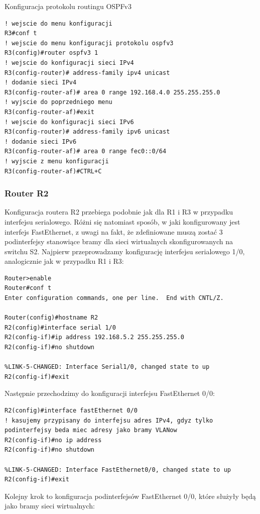 \documentclass[polish,11pt,a4paper,twoside]{article}
\begin{document}
Konfiguracja protokolu routingu OSPFv3
\begin{lstlisting}
! wejscie do menu konfiguracji
R3#conf t
! wejscie do menu konfiguracji protokolu ospfv3
R3(config)#router ospfv3 1 
! wejscie do konfiguracji sieci IPv4
R3(config-router)# address-family ipv4 unicast 
! dodanie sieci IPv4
R3(config-router-af)# area 0 range 192.168.4.0 255.255.255.0 
! wyjscie do poprzedniego menu
R3(config-router-af)#exit
! wejscie do konfiguracji sieci IPv6
R3(config-router)# address-family ipv6 unicast
! dodanie sieci IPv6
R3(config-router-af)# area 0 range fec0::0/64
! wyjscie z menu konfiguracji
R3(config-router-af)#CTRL+C
\end{lstlisting}

\subsubsection{Router R2}
Konfiguracja routera R2 przebiega podobnie jak dla R1 i R3 w przypadku interfejsu serialowego. Różni się natomiast sposób, w jaki konfigurowany jest interfejs FastEthernet, z uwagi na fakt, że zdefiniowane muszą zostać 3 podinterfejsy stanowiące bramy dla sieci wirtualnych skonfigurowanych na switchu S2.
Najpierw przeprowadzamy konfigurację interfejsu serialowego 1/0, analogicznie jak w przypadku R1 i R3:
\begin{lstlisting}
Router>enable
Router#conf t
Enter configuration commands, one per line.  End with CNTL/Z.

Router(config)#hostname R2
R2(config)#interface serial 1/0
R2(config-if)#ip address 192.168.5.2 255.255.255.0
R2(config-if)#no shutdown 

%LINK-5-CHANGED: Interface Serial1/0, changed state to up
R2(config-if)#exit
\end{lstlisting}
Następnie przechodzimy do konfiguracji interfejsu FastEthernet 0/0:
\begin{lstlisting}
R2(config)#interface fastEthernet 0/0
! kasujemy przypisany do interfejsu adres IPv4, gdyz tylko podinterfejsy beda miec adresy jako bramy VLANow
R2(config-if)#no ip address
R2(config-if)#no shutdown 

%LINK-5-CHANGED: Interface FastEthernet0/0, changed state to up
R2(config-if)#exit
\end{lstlisting}
Kolejny krok to konfiguracja podinterfejsów FastEthernet 0/0, które służyły będą jako bramy sieci wirtualnych:
\end{document}
